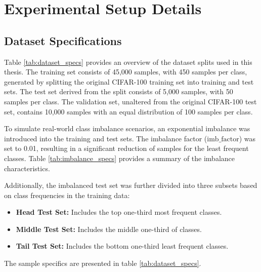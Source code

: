 \chapter{Experimental Setup Details}
\section{Dataset Specifications}
\label{app:data_spec}
Table \ref{tab:dataset_specs} provides an overview of the dataset splits used in this thesis. The training set consists of 45,000 samples, with 450 samples per class, generated by splitting the original CIFAR-100 training set into training and test sets. The test set derived from the split consists of 5,000 samples, with 50 samples per class. The validation set, unaltered from the original CIFAR-100 test set, contains 10,000 samples with an equal distribution of 100 samples per class.

To simulate real-world class imbalance scenarios, an exponential imbalance was introduced into the training and test sets. The imbalance factor (\(\text{imb\_factor}\)) was set to 0.01, resulting in a significant reduction of samples for the least frequent classes. Table \ref{tab:imbalance_specs} provides a summary of the imbalance characteristics.

Additionally, the imbalanced test set was further divided into three subsets based on class frequencies in the training data:

\begin{itemize}
    \item \textbf{Head Test Set:} Includes the top one-third most frequent classes.
    \item \textbf{Middle Test Set:} Includes the middle one-third of classes.
    \item \textbf{Tail Test Set:} Includes the bottom one-third least frequent classes.
\end{itemize}

The sample specifics are presented in table \ref{tab:dataset_specs}.



